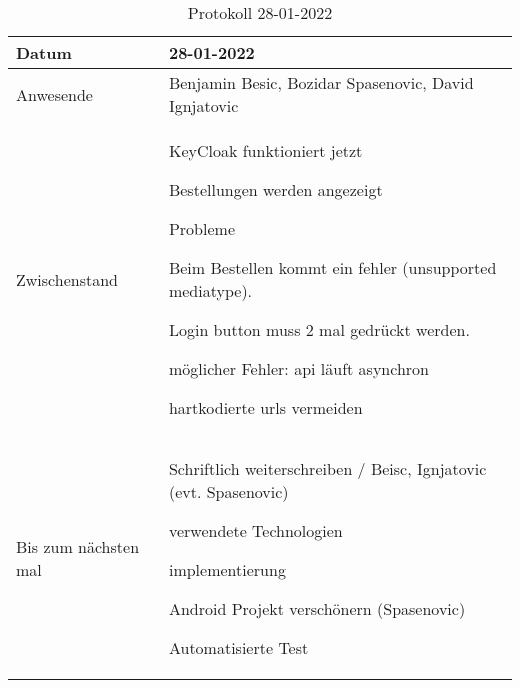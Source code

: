 \begin{table}
    \begin{tabular}{ |p{3cm}|p{10cm}|  }
        \hline
        Datum & 28-01-2022\\
        \hline
        Anwesende & Benjamin Besic, Bozidar Spasenovic, David Ignjatovic\\

        \hline
        Zwischenstand& 

        KeyCloak funktioniert jetzt
    
        Bestellungen werden angezeigt
    
   Probleme
    
        Beim Bestellen kommt ein fehler (unsupported mediatype).
    
        Login button muss 2 mal gedrückt werden.
    
            möglicher Fehler: api läuft asynchron
    
        hartkodierte urls vermeiden
    
    \\
        \hline
        Bis zum nächsten mal &  

        Schriftlich weiterschreiben / Beisc, Ignjatovic (evt. Spasenovic)
    
            verwendete Technologien
    
            implementierung
    
        Android Projekt verschönern (Spasenovic)
    
        Automatisierte Test
    \\
        \hline
    \end{tabular}
    \caption{Protokoll  28-01-2022}
    \label{tab:my_label}
\end{table}
